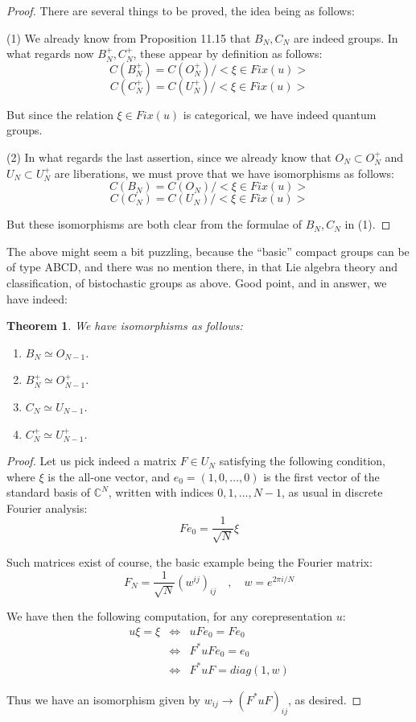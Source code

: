 \documentclass[12pt]{amsbook}
\newtheorem{theorem}{Theorem}[chapter]
\begin{document}
\begin{proof}
There are several things to be proved, the idea being as follows:

\medskip

(1) We already know from Proposition 11.15 that $B_N,C_N$ are indeed groups. In what regards now $B_N^+,C_N^+$, these appear by definition as follows:
$$C(B_N^+)=C(O_N^+)\Big/\Big<\xi\in Fix(u)\Big>$$
$$C(C_N^+)=C(U_N^+)\Big/\Big<\xi\in Fix(u)\Big>$$

But since the relation $\xi\in Fix(u)$ is categorical, we have indeed quantum groups.

\medskip

(2) In what regards the last assertion, since we already know that $O_N\subset O_N^+$ and $U_N\subset U_N^+$ are liberations, we must prove that we have isomorphisms as follows:
$$C(B_N)=C(O_N)\Big/\Big<\xi\in Fix(u)\Big>$$
$$C(C_N)=C(U_N)\Big/\Big<\xi\in Fix(u)\Big>$$

But these isomorphisms are both clear from the formulae of $B_N,C_N$ in (1).
\end{proof}

The above might seem a bit puzzling, because the ``basic'' compact groups can be of type ABCD, and there was no mention there, in that Lie algebra theory and classification, of bistochastic groups as above. Good point, and in answer, we have indeed:

\begin{theorem}
We have isomorphisms as follows:
\begin{enumerate}
\item $B_N\simeq O_{N-1}$.

\item $B_N^+\simeq O_{N-1}^+$.

\item $C_N\simeq U_{N-1}$.

\item $C_N^+\simeq U_{N-1}^+$.
\end{enumerate}
\end{theorem}

\begin{proof}
Let us pick indeed a matrix $F\in U_N$ satisfying the following condition, where $\xi$ is the all-one vector, and $e_0=(1,0,\ldots,0)$ is the first vector of the standard basis of $\mathbb C^N$, written with indices $0,1,\ldots,N-1$, as usual in discrete Fourier analysis:
$$Fe_0=\frac{1}{\sqrt{N}}\xi$$

Such matrices exist of course, the basic example being the Fourier matrix:
$$F_N=\frac{1}{\sqrt{N}}(w^{ij})_{ij}\quad,\quad w=e^{2\pi i/N}$$

We have then the following computation, for any corepresentation $u$:
\begin{eqnarray*}
u\xi=\xi
&\iff&uFe_0=Fe_0\\
&\iff&F^*uFe_0=e_0\\
&\iff&F^*uF=diag(1,w)
\end{eqnarray*}

Thus we have an isomorphism given by $w_{ij}\to(F^*uF)_{ij}$, as desired.
\end{proof}
\end{document}
